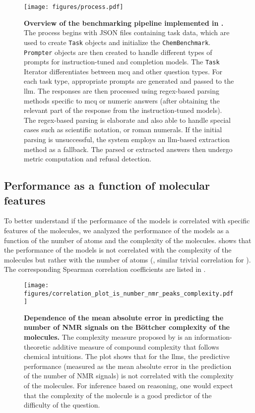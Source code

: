 \begin{figure}
    \centering 
    \texttt{[image: figures/process.pdf]}
    \caption{\textbf{Overview of the benchmarking pipeline implemented in \chembench.} The process begins with JSON files containing task data, which are used to create \texttt{Task} objects and initialize the \texttt{ChemBenchmark}. \texttt{Prompter} objects are then created to handle different types of prompts for instruction-tuned and completion models.
    The \texttt{Task} Iterator differentiates between \gls{mcq} and other question types. For each task type, appropriate prompts are generated and passed to the \gls{llm}. The responses are then processed using regex-based parsing methods specific to \gls{mcq} or numeric answers (after obtaining the relevant part of the response from the instruction-tuned models). 
    The regex-based parsing is elaborate and also able to handle special cases such as scientific notation, or roman numerals.
    If the initial parsing is unsuccessful, the system employs an \gls{llm}-based extraction method as a fallback. The parsed or extracted answers then undergo metric computation and refusal detection.}
    \label{fig:process}
\end{figure}

\subsection{Performance as a function of molecular features}
To better understand if the performance of the models is correlated with specific features of the molecules, we analyzed the performance of the models as a function of the number of atoms and the complexity of the molecules.
 shows that the performance of the models is not correlated with the complexity of the molecules but rather with the number of atoms (, similar trivial correlation for ). 
The corresponding Spearman correlation coefficients are listed in .

\begin{figure}
    \centering 
    \texttt{[image: figures/correlation\_plot\_is\_number\_nmr\_peaks\_complexity.pdf]}
    \caption{\textbf{Dependence of the mean absolute error in predicting the number of NMR signals on the Böttcher complexity of the molecules.} The complexity measure proposed by \textcite{B_ttcher_2016} is an information-theoretic additive measure of compound complexity that follows chemical intuitions.
    The plot shows that for the \glspl{llm}, the predictive performance (measured as the mean absolute error in the prediction of the number of NMR signals) is not correlated with the complexity of the molecules. For inference based on reasoning, one would expect that the complexity of the molecule is a good predictor of the difficulty of the question.}
    \label{fig:correlation_plot_is_number_nmr_peaks_complexity}
\end{figure}

